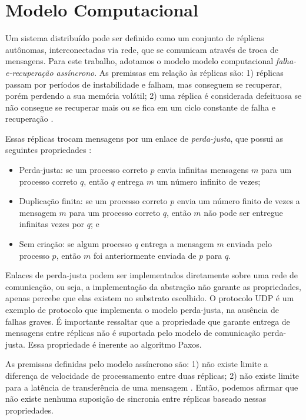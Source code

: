 \section{Modelo Computacional}\label{sec:modelo-computacional}

Um sistema distribuído pode ser definido como um conjunto de réplicas autônomas,
interconectadas via rede, que se comunicam através de troca de mensagens. Para este
trabalho, adotamos o modelo modelo computacional \emph{falha-e-recuperação assíncrono}. As
premissas em relação às réplicas são: 1) réplicas passam por períodos de instabilidade e
falham, mas conseguem se recuperar, porém perdendo a sua memória volátil; 2) uma réplica é
considerada defeituosa se não consegue se recuperar mais ou se fica em um ciclo constante
de falha e recuperação \cite{cachin11}.

Essas réplicas trocam mensagens por um enlace de \emph{perda-justa}, que possui as
seguintes propriedades \cite{cachin11}:
\begin{itemize}
  \item Perda-justa: se um processo correto $p$ envia infinitas mensagens $m$ para um
    processo correto $q$, então $q$ entrega $m$ um número infinito de vezes;
  \item Duplicação finita: se um processo correto $p$ envia um número finito de vezes a
    mensagem $m$ para um processo correto $q$, então $m$ não pode ser entregue infinitas
    vezes por $q$; e
  \item Sem criação: se algum processo $q$ entrega a mensagem $m$ enviada pelo processo
    $p$, então $m$ foi anteriormente enviada de $p$ para $q$.
\end{itemize}

Enlaces de perda-justa podem ser implementados diretamente sobre uma rede de comunicação,
ou seja, a implementação da abstração não garante as propriedades, apenas percebe que elas
existem no substrato escolhido. O protocolo UDP é um exemplo de protocolo que implementa o
modelo perda-justa, na ausência de falhas graves. É importante ressaltar que a propriedade
que garante entrega de mensagens entre réplicas não é suportada pelo modelo de comunicação
perda-justa. Essa propriedade é inerente ao algoritmo Paxos.

As premissas definidas pelo modelo assíncrono são: 1) não existe limite a diferença de
velocidade de processamento entre duas réplicas; 2) não existe limite para a latência de
transferência de uma mensagem \cite{cachin11}. Então, podemos afirmar que não existe
nenhuma suposição de sincronia entre réplicas baseado nessas propriedades.

